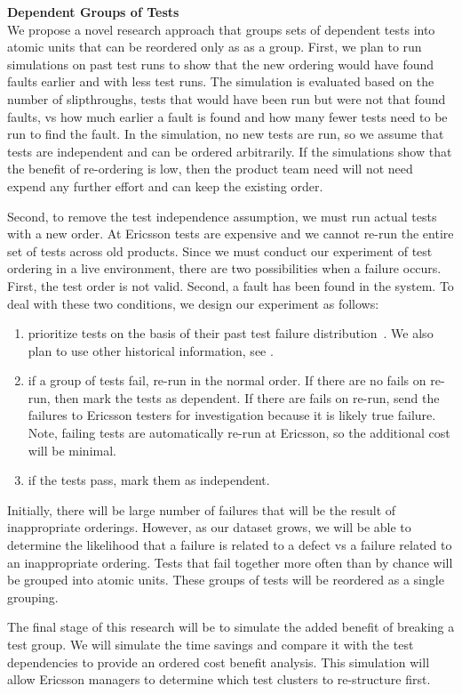 \textbf{Dependent Groups of Tests}\\
We propose a novel research approach that groups sets of dependent tests into atomic units that can be reordered only as as a group. 
%
First, we plan to run simulations on past test runs to show that the new ordering would have found faults earlier and with less test runs. The simulation is evaluated based on the number of slipthroughs, \ie tests that would have been run but were not that found faults, vs how much earlier a fault is found and how many fewer tests need to be run to find the fault. 
%
In the simulation, no new tests are run, so we assume that tests are independent and can be ordered arbitrarily. If the simulations show that the benefit of re-ordering is low, then the product team need will not need expend any further effort and can keep the existing order.

Second, to remove the test independence assumption, we must run actual tests with a new order. At Ericsson tests are expensive and we cannot re-run the entire set of tests across old products.
%
Since we must conduct our experiment of test ordering in a live environment, there are two possibilities when a failure occurs. First, the test order is not valid. Second, a fault has been found in the system. To deal with these two conditions, we design our experiment as follows:

\begin{enumerate}

\item prioritize tests on the basis of their past test failure distribution~\cite{}. We also plan to use other historical information, see .

\item if a group of tests fail, re-run in the normal order. If there are no fails on re-run, then mark the tests as dependent. If there are fails on re-run, send the failures to Ericsson testers for investigation because it is likely true failure. Note, failing tests are automatically re-run at Ericsson, so the additional cost will be minimal.
 
\item if the tests pass, mark them as independent.

\end{enumerate}

Initially, there will be large number of failures that will be the result of inappropriate orderings. However, as our dataset grows, we will be able to determine the likelihood that a failure is related to a defect vs a failure related to an inappropriate ordering. Tests that fail together more often than by chance will be grouped into atomic units. These groups of tests will be reordered as a single grouping.

The final stage of this research will be to simulate the added benefit of breaking a test group. We will simulate the time savings and compare it with the test dependencies to provide an ordered cost benefit analysis. This simulation will allow Ericsson managers to determine which test clusters to re-structure first.



